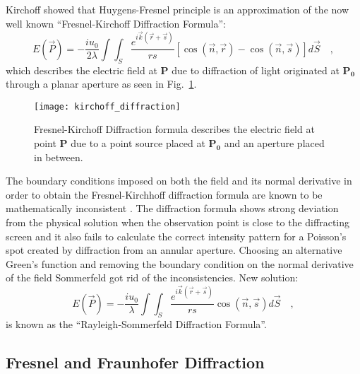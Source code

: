 Kirchoff \cite{kirchoff1883} showed that Huygens-Fresnel principle is an approximation of the now well known ``Fresnel-Kirchoff Diffraction Formula'':
\begin{equation}
\label{eq:fresnel_kirchoff}
E(\vec{P}) = -\frac{iu_0}{2\lambda}\int \int _S \frac{e^{i\vec{k}(\vec{r}+\vec{s})}}{rs}\left[\cos (\vec{n},\vec{r}) - \cos (\vec{n},\vec{s})\right]d\vec{S} \quad ,
\end{equation}
which describes the electric field at \textbf{P} due to diffraction of light originated at $\mathbf{P_0}$ through a planar aperture as seen in Fig.~\ref{fig:kirchoff_diffraction}.
\begin{figure}[t!]
  \centering
  \texttt{[image: kirchoff\_diffraction]}
  \caption{Fresnel-Kirchoff Diffraction formula describes the electric field at point $\mathbf{P}$ due to a point source placed at $\mathbf{P_0}$ and an aperture placed in between.}
  \label{fig:kirchoff_diffraction}
\end{figure}
The boundary conditions imposed on both the field and its normal derivative in order to obtain the Fresnel-Kirchhoff diffraction formula are known to be mathematically inconsistent \cite{Lucke_2006, Heurtley:73, Sommerfeld:1954:O}.  The diffraction formula shows strong deviation from the physical solution when the observation point is close to the diffracting screen and it also fails to calculate the correct intensity pattern for a Poisson's spot created by diffraction from an annular aperture. Choosing an alternative Green's function and removing the boundary condition on the normal derivative of the field Sommerfeld got rid of the inconsistencies. New solution:
\begin{equation}
\label{eq:rayleigh_sommerfeld}
E(\vec{P}) = -\frac{iu_0}{\lambda}\int \int _S \frac{e^{i\vec{k}(\vec{r}+\vec{s})}}{rs} \cos (\vec{n},\vec{s}) d\vec{S} \quad ,
\end{equation}
is known as the ``Rayleigh-Sommerfeld Diffraction Formula''.

\subsection{Fresnel and Fraunhofer Diffraction}
%

